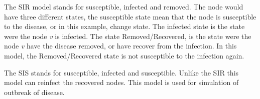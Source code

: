 The SIR model stands for susceptible, infected and removed. The node would have three different states, the susceptible state mean that the node is susceptible to the disease, or in this example, change state. The infected state is the state were the node {\it v} is infected. The state Removed/Recovered, is the state were the node {\it v} have the disease removed, or have recover from the infection. In this model, the Removed/Recovered state is not susceptible to the infection again. 

The SIS stands for susceptible, infected and susceptible. Unlike the SIR this model can reinfect the recovered nodes. This model is used for simulation of outbreak of disease. 